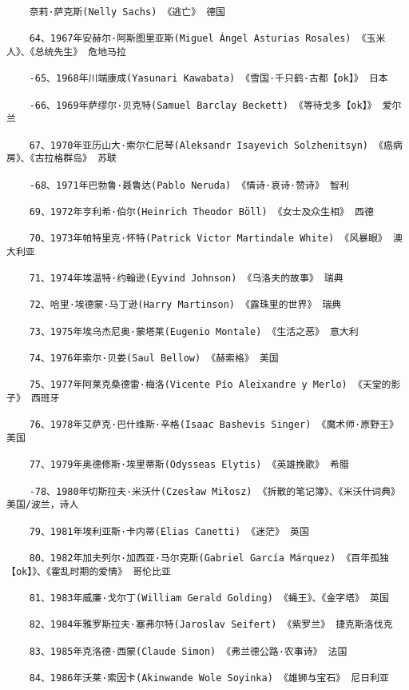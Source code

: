 \documentclass[UTF8]{../RepresentationUniverse}
\begin{document}
\begin{lstlisting}
    奈莉·萨克斯(Nelly Sachs) 《逃亡》 德国
    
    64、1967年安赫尔·阿斯图里亚斯(Miguel Ángel Asturias Rosales) 《玉米人》、《总统先生》 危地马拉
    
    -65、1968年川端康成(Yasunari Kawabata) 《雪国·千只鹤·古都【ok】》 日本
    
    -66、1969年萨缪尔·贝克特(Samuel Barclay Beckett) 《等待戈多【ok】》 爱尔兰
    
    67、1970年亚历山大·索尔仁尼琴(Aleksandr Isayevich Solzhenitsyn) 《癌病房》、《古拉格群岛》 苏联
    
    -68、1971年巴勃鲁·聂鲁达(Pablo Neruda) 《情诗·哀诗·赞诗》 智利
    
    69、1972年亨利希·伯尔(Heinrich Theodor Böll) 《女士及众生相》 西德
    
    70、1973年帕特里克·怀特(Patrick Victor Martindale White) 《风暴眼》 澳大利亚
    
    71、1974年埃温特·约翰逊(Eyvind Johnson) 《乌洛夫的故事》 瑞典
    
    72、哈里·埃德蒙·马丁逊(Harry Martinson) 《露珠里的世界》 瑞典
    
    73、1975年埃乌杰尼奥·蒙塔莱(Eugenio Montale) 《生活之恶》 意大利
    
    74、1976年索尔·贝娄(Saul Bellow) 《赫索格》 美国
    
    75、1977年阿莱克桑德雷·梅洛(Vicente Pío Aleixandre y Merlo) 《天堂的影子》 西班牙
    
    76、1978年艾萨克·巴什维斯·辛格(Isaac Bashevis Singer) 《魔术师·原野王》 美国
    
    77、1979年奥德修斯·埃里蒂斯(Odysseas Elytis) 《英雄挽歌》 希腊
    
    -78、1980年切斯拉夫·米沃什(Czesław Miłosz) 《拆散的笔记簿》、《米沃什词典》 美国/波兰，诗人
    
    79、1981年埃利亚斯·卡内蒂(Elias Canetti) 《迷茫》 英国
    
    80、1982年加夫列尔·加西亚·马尔克斯(Gabriel García Márquez) 《百年孤独【ok】》、《霍乱时期的爱情》 哥伦比亚
    
    81、1983年威廉·戈尔丁(William Gerald Golding) 《蝇王》、《金字塔》 英国
    
    82、1984年雅罗斯拉夫·塞弗尔特(Jaroslav Seifert) 《紫罗兰》 捷克斯洛伐克
    
    83、1985年克洛德·西蒙(Claude Simon) 《弗兰德公路·农事诗》 法国
    
    84、1986年沃莱·索因卡(Akinwande Wole Soyinka) 《雄狮与宝石》 尼日利亚
    

\end{lstlisting}
\end{document}
